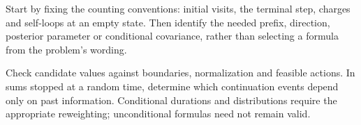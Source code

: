 Start by fixing the counting conventions: initial visits, the terminal step, charges and self-loops at an empty state. Then identify the needed prefix, direction, posterior parameter or conditional covariance, rather than selecting a formula from the problem's wording.

Check candidate values against boundaries, normalization and feasible actions. In sums stopped at a random time, determine which continuation events depend only on past information. Conditional durations and distributions require the appropriate reweighting; unconditional formulas need not remain valid.
\par\smallskip
